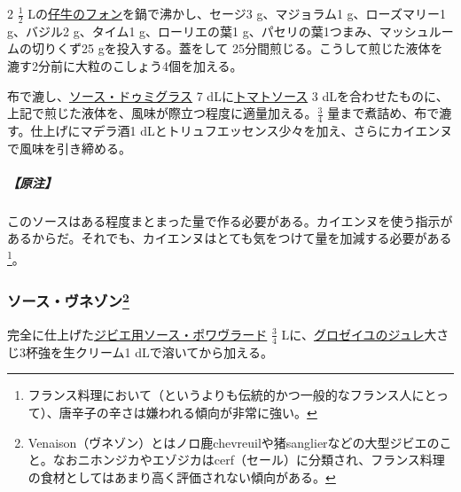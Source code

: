 \begin{recette}
 

2 \(\frac{1}{2}\)
Lの\protect\hyperlink{jus-de-veau-brun}{仔牛のフォン}を鍋で沸かし、セージ3
g、マジョラム1 g、ローズマリー1 g、バジル2 g、タイム1 g、ローリエの葉1
g、パセリの葉1つまみ、マッシュルームの切りくず25 gを投入する。蓋をして
25分間煎じる。こうして煎じた液体を漉す2分前に大粒のこしょう4個を加える。

布で漉し、\protect\hyperlink{sauce-demi-glace}{ソース・ドゥミグラス} 7
dLに\protect\hyperlink{sauce-tomate}{トマトソース} 3
dLを合わせたものに、上記で煎じた液体を、風味が際立つ程度に適量加える。\(\frac{3}{4}\)
量まで煮詰め、布で漉す。仕上げにマデラ酒1
dLとトリュフエッセンス少々を加え、さらにカイエンヌで風味を引き締める。

\hypertarget{nota-sauce-tortue}{%
\subparagraph{【原注】}\label{nota-sauce-tortue}}

このソースはある程度まとまった量で作る必要がある。カイエンヌを使う指示があるからだ。それでも、カイエンヌはとても気をつけて量を加減する必要がある\footnote{フランス料理において（というよりも伝統的かつ一般的なフランス人にとって）、唐辛子の辛さは嫌われる傾向が非常に強い。}。

\atoaki{}

\hypertarget{sauce-venaison}{%
\subsubsection[ソース・ヴネゾン]{\texorpdfstring{ソース・ヴネゾン\footnote{Venaison（ヴネゾン）とはノロ鹿chevreuilや猪sanglierなどの大型ジビエのこと。なおニホンジカやエゾジカはcerf（セール）に分類され、フランス料理の食材としてはあまり高く評価されない傾向がある。}}{ソース・ヴネゾン}}\label{sauce-venaison}}


 

完全に仕上げた\protect\hyperlink{sauce-poivrade-pour-gibier}{ジビエ用ソース・ポワヴラード}
\(\frac{3}{4}\)
Lに、\protect\hyperlink{gelee-de-groseilles-a}{グロゼイユのジュレ}大さじ3杯強を生クリーム1
dLで溶いてから加える。


\end{recette}
